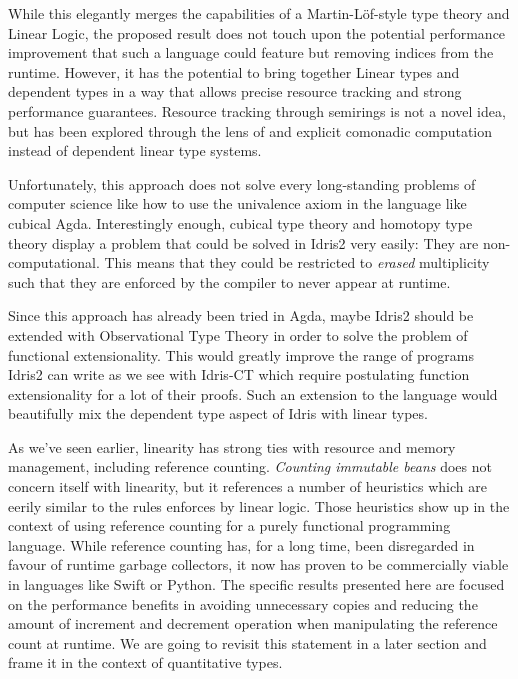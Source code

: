 \documentclass[
]{article}
\begin{document}
While this elegantly merges the capabilities of a Martin-Löf-style type
theory\cite{martin-lof} and Linear Logic\cite{linear-logic}, the
proposed result does not touch upon the potential performance
improvement that such a language could feature but removing indices from
the runtime\cite{store_indices}. However, it has the potential to bring
together Linear types and dependent types in a way that allows precise
resource tracking and strong performance guarantees. Resource tracking
through semirings is not a novel idea, but has been explored through the
lens of and explicit comonadic computation \cite{parametric_effects}
instead of dependent linear type systems.

Unfortunately, this approach does not solve every long-standing problems
of computer science like how to use the univalence axiom in the language
like cubical Agda\cite{cubical_agda}. Interestingly enough, cubical type
theory and homotopy type theory display a problem that could be solved
in Idris2 very easily: They are non-computational. This means that they
could be restricted to \emph{erased} multiplicity such that they are
enforced by the compiler to never appear at runtime.

Since this approach has already been tried in Agda\cite{agda}, maybe
Idris2 should be extended with Observational Type Theory \cite{ott} in
order to solve the problem of functional extensionality. This would
greatly improve the range of programs Idris2 can write as we see with
Idris-CT\cite{idris-ct} which require postulating function
extensionality for a lot of their proofs. Such an extension to the
language would beautifully mix the dependent type aspect of Idris with
linear types.

As we've seen earlier, linearity has strong ties with resource and
memory management, including reference counting. \emph{Counting
immutable beans}\cite{immutable_beans} does not concern itself with
linearity, but it references a number of heuristics which are eerily
similar to the rules enforces by linear logic. Those heuristics show up
in the context of using reference counting for a purely functional
programming language. While reference counting has, for a long time,
been disregarded in favour of runtime garbage collectors, it now has
proven to be commercially viable in languages like Swift or Python. The
specific results presented here are focused on the performance benefits
in avoiding unnecessary copies and reducing the amount of increment and
decrement operation when manipulating the reference count at runtime. We
are going to revisit this statement in a later section and frame it in
the context of quantitative types.
\end{document}
